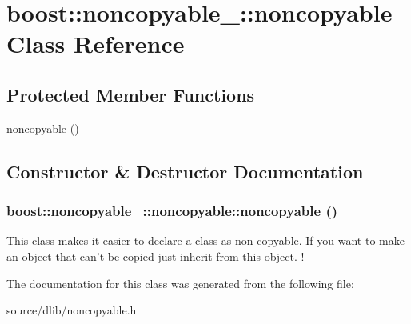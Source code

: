 \hypertarget{classboost_1_1noncopyable___1_1noncopyable}{
\section{boost::noncopyable\_\-::noncopyable Class Reference}
\label{classboost_1_1noncopyable___1_1noncopyable}
}
\subsection*{Protected Member Functions}
\begin{DoxyCompactItemize}
\item 
\hyperlink{classboost_1_1noncopyable___1_1noncopyable_a39380533ef795a888a120ec0b1eb9333}{noncopyable} ()
\end{DoxyCompactItemize}


\subsection{Constructor \& Destructor Documentation}
\hypertarget{classboost_1_1noncopyable___1_1noncopyable_a39380533ef795a888a120ec0b1eb9333}{
\subsubsection[{noncopyable}]{\setlength{\rightskip}{0pt plus 5cm}boost::noncopyable\_\-::noncopyable::noncopyable ()}}
\label{classboost_1_1noncopyable___1_1noncopyable_a39380533ef795a888a120ec0b1eb9333}
This class makes it easier to declare a class as non-\/copyable. If you want to make an object that can't be copied just inherit from this object. ! 

The documentation for this class was generated from the following file:\begin{DoxyCompactItemize}
\item 
source/dlib/noncopyable.h\end{DoxyCompactItemize}
